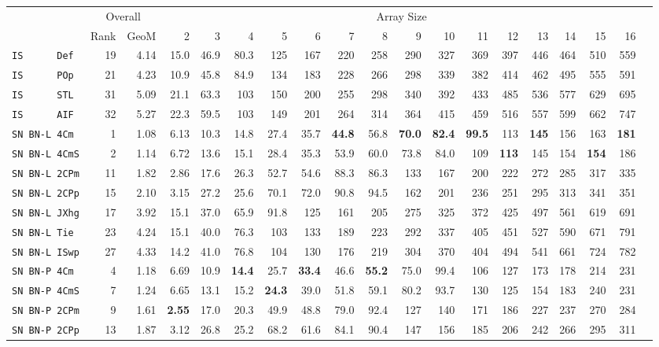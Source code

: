 \begin{tabular}{l | r @{~~} r | r@{~~}r@{~~}r@{~~}r@{~~}r@{~~}r@{~~}r@{~~}r@{~~}r@{~~}r@{~~}r@{~~}r@{~~}r@{~~}r@{~~}r@{~~}r|}
 & \multicolumn{2}{c|}{Overall} & \multicolumn{15}{c}{Array Size} \\
 & Rank & GeoM & 2&3&4&5&6&7&8&9&10&11&12&13&14&15&16\\ \hline
\verb+IS      Def+ & 19 & 4.14 & 15.0&46.9&80.3&125&167&220&258&290&327&369&397&446&464&510&559\\
\verb+IS      POp+ & 21 & 4.23 & 10.9&45.8&84.9&134&183&228&266&298&339&382&414&462&495&555&591\\
\verb+IS      STL+ & 31 & 5.09 & 21.1&63.3&103&150&200&255&298&340&392&433&485&536&577&629&695\\
\verb+IS      AIF+ & 32 & 5.27 & 22.3&59.5&103&149&201&264&314&364&415&459&516&557&599&662&747\smallskip \\
\verb+SN BN-L 4Cm + & 1 & 1.08 & 6.13&10.3&14.8&27.4&35.7&\textbf{44.8}&56.8&\textbf{70.0}&\textbf{82.4}&\textbf{99.5}&113&\textbf{145}&156&163&\textbf{181}\\
\verb+SN BN-L 4CmS+ & 2 & 1.14 & 6.72&13.6&15.1&28.4&35.3&53.9&60.0&73.8&84.0&109&\textbf{113}&145&154&\textbf{154}&186\\
\verb+SN BN-L 2CPm+ & 11 & 1.82 & 2.86&17.6&26.3&52.7&54.6&88.3&86.3&133&167&200&222&272&285&317&335\\
\verb+SN BN-L 2CPp+ & 15 & 2.10 & 3.15&27.2&25.6&70.1&72.0&90.8&94.5&162&201&236&251&295&313&341&351\\
\verb+SN BN-L JXhg+ & 17 & 3.92 & 15.1&37.0&65.9&91.8&125&161&205&275&325&372&425&497&561&619&691\\
\verb+SN BN-L Tie + & 23 & 4.24 & 15.1&40.0&76.3&103&133&189&223&292&337&405&451&527&590&671&791\\
\verb+SN BN-L ISwp+ & 27 & 4.33 & 14.2&41.0&76.8&104&130&176&219&304&370&404&494&541&661&724&782\smallskip \\
\verb+SN BN-P 4Cm + & 4 & 1.18 & 6.69&10.9&\textbf{14.4}&25.7&\textbf{33.4}&46.6&\textbf{55.2}&75.0&99.4&106&127&173&178&214&231\\
\verb+SN BN-P 4CmS+ & 7 & 1.24 & 6.65&13.1&15.2&\textbf{24.3}&39.0&51.8&59.1&80.2&93.7&130&125&154&183&240&231\\
\verb+SN BN-P 2CPm+ & 9 & 1.61 & \textbf{2.55}&17.0&20.3&49.9&48.8&79.0&92.4&127&140&171&186&227&237&270&284\\
\verb+SN BN-P 2CPp+ & 13 & 1.87 & 3.12&26.8&25.2&68.2&61.6&84.1&90.4&147&156&185&206&242&266&295&311\\

\end{tabular}
